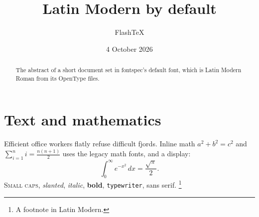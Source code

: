 \documentclass[11pt]{article}
\begin{document}
\title{Latin Modern by default}
\author{FlashTeX}
\date{4 October 2026}
\maketitle
\begin{abstract}
The abstract of a short document set in fontspec's default font, which is
Latin Modern Roman from its OpenType files.
\end{abstract}
\section{Text and mathematics}
Efficient office workers flatly refuse difficult fjords. Inline math
$a^2+b^2=c^2$ and $\sum_{i=1}^n i = \frac{n(n+1)}{2}$ uses the legacy math
fonts, and a display:
\[ \int_0^\infty e^{-x^2}\,dx = \frac{\sqrt{\pi}}{2}. \]
\textsc{Small caps}, \textsl{slanted}, \textit{italic}, \textbf{bold},
\texttt{typewriter}, \textsf{sans serif}.
\footnote{A footnote in Latin Modern.}
\end{document}

